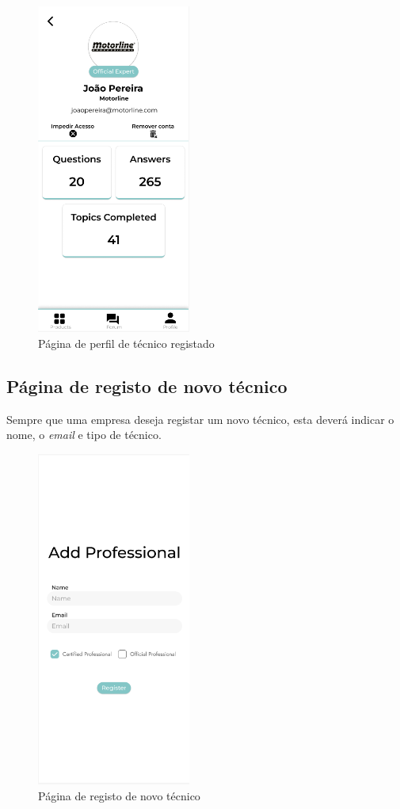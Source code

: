 \begin{figure}[htb]
  \centering
  \includegraphics[width=0.45\textwidth]{images/mockups/professional_profile.png}
  \caption{Página de perfil de técnico registado}
  \label{fig:32}
\end{figure}

\newpage

\subsection{Página de registo de novo técnico}

Sempre que uma empresa deseja registar um novo técnico, esta deverá indicar o nome, o \textit{email} e tipo de técnico.

\begin{figure}[htb]
  \centering
  \includegraphics[width=0.45\textwidth]{images/mockups/account_registering.png}
  \caption{Página de registo de novo técnico}
  \label{fig:33}
\end{figure}